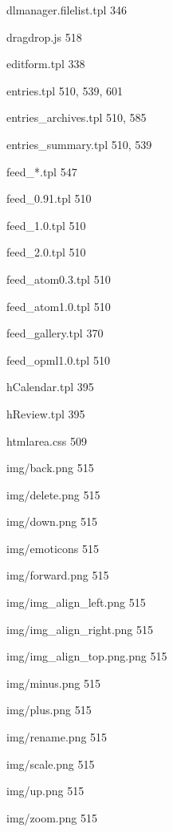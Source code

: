 \documentclass{book}
\renewcommand\subitem{\par}
\begin{document}
\begin{multicols}{2}
\begin{osp-index}
    \subitem dlmanager.filelist.tpl\hspace{1mm} 346
    \subitem dragdrop.js\hspace{1mm} 518
    \subitem editform.tpl\hspace{1mm} 338
    \subitem entries.tpl\hspace{1mm} 510, 539, 601
    \subitem entries\_archives.tpl\hspace{1mm} 510, 585
    \subitem entries\_summary.tpl\hspace{1mm} 510, 539
    \subitem feed\_*.tpl\hspace{1mm} 547
    \subitem feed\_0.91.tpl\hspace{1mm} 510
    \subitem feed\_1.0.tpl\hspace{1mm} 510
    \subitem feed\_2.0.tpl\hspace{1mm} 510
    \subitem feed\_atom0.3.tpl\hspace{1mm} 510
    \subitem feed\_atom1.0.tpl\hspace{1mm} 510
    \subitem feed\_gallery.tpl\hspace{1mm} 370
    \subitem feed\_opml1.0.tpl\hspace{1mm} 510
    \subitem hCalendar.tpl\hspace{1mm} 395
    \subitem hReview.tpl\hspace{1mm} 395
    \subitem htmlarea.css\hspace{1mm} 509
    \subitem img/back.png\hspace{1mm} 515
    \subitem img/delete.png\hspace{1mm} 515
    \subitem img/down.png\hspace{1mm} 515
    \subitem img/emoticons\hspace{1mm} 515
    \subitem img/forward.png\hspace{1mm} 515
    \subitem img/img\_align\_left.png\hspace{1mm} 515
    \subitem img/img\_align\_right.png\hspace{1mm} 515
    \subitem img/img\_align\_top.png.png\hspace{1mm} 515
    \subitem img/minus.png\hspace{1mm} 515
    \subitem img/plus.png\hspace{1mm} 515
    \subitem img/rename.png\hspace{1mm} 515
    \subitem img/scale.png\hspace{1mm} 515
    \subitem img/up.png\hspace{1mm} 515
    \subitem img/zoom.png\hspace{1mm} 515

\end{osp-index}
\end{multicols}
\end{document}
